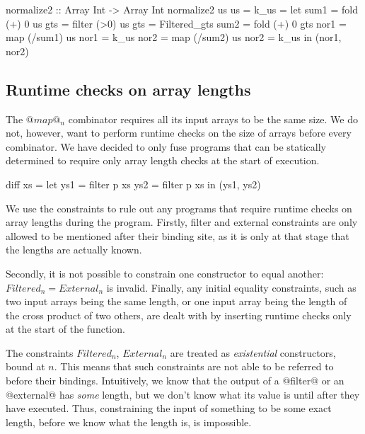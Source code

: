 \begin{code}
 normalize2 :: Array Int -> Array Int
 normalize2 us                   {us   = k_us}
  = let sum1 = fold   (+) 0 us   
        gts  = filter (>0)  us   {gts  = Filtered_gts}
        sum2 = fold   (+) 0 gts   
        nor1 = map  (/sum1) us   {nor1 = k_us}
        nor2 = map  (/sum2) us   {nor2 = k_us}
    in (nor1, nor2)
\end{code}

\subsection{Runtime checks on array lengths}
The $@map@_n$ combinator requires all its input arrays to be the same size.
We do not, however, want to perform runtime checks on the size of arrays before every combinator.
We have decided to only fuse programs that can be statically determined to require only array length checks at the start of execution. 

\begin{code}
 diff xs = let ys1 = filter p xs
               ys2 = filter p xs
           in  (ys1, ys2)
\end{code}




We use the constraints to rule out any programs that require runtime checks on array lengths during the program. Firstly, filter and external constraints are only allowed to be mentioned after their binding site, as it is only at that stage that the lengths are actually known.


Secondly, it is not possible to constrain one constructor to equal another: $Filtered_n = External_n$ is invalid. Finally, any initial equality constraints, such as two input arrays being the same length, or one input array being the length of the cross product of two others, are dealt with by inserting runtime checks only at the start of the function.


The constraints $Filtered_n$, $External_n$ are treated as \emph{existential} constructors, bound at $n$. This means that such constraints are not able to be referred to before their bindings.
Intuitively, we know that the output of a @filter@ or an @external@ has \emph{some} length, but we don't know what its value is until after they have executed. Thus, constraining the input of something to be some exact length, before we know what the length is, is impossible.

